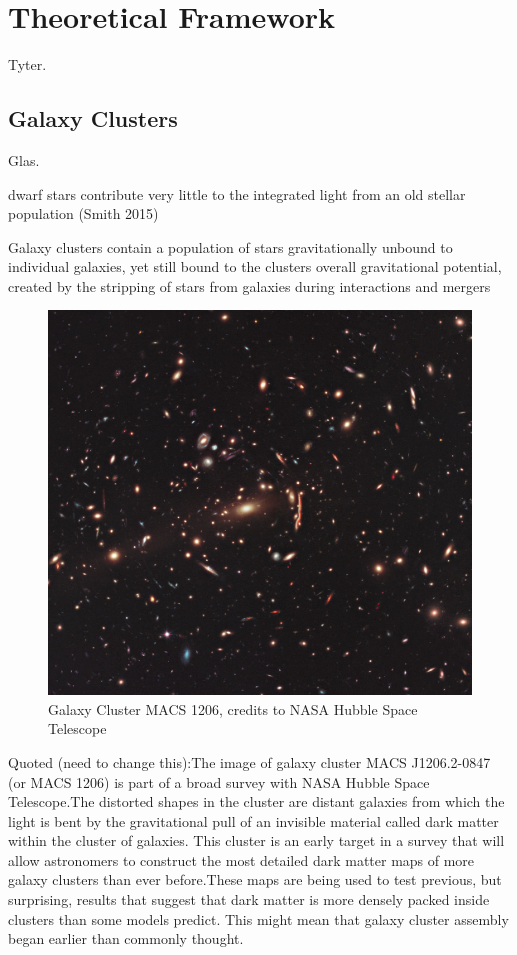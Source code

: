 \chapter{Theoretical Framework}

Tyter. 

\section{Galaxy Clusters}
 
Glas.

dwarf stars contribute very little to the integrated light from an old stellar population (Smith 2015)

Galaxy clusters contain a population of stars gravitationally unbound to individual galaxies, yet still bound to the clusters overall gravitational potential, created by the stripping of stars from galaxies during interactions and mergers

\begin{figure}[H]
\centering
\includegraphics[width=12cm]{images/GC.jpg}
\caption[Galaxy Cluster MACS 1206]{Galaxy Cluster MACS 1206, credits to NASA Hubble Space Telescope}
\end{figure}

Quoted (need to change this):The image of galaxy cluster MACS J1206.2-0847 (or MACS 1206) is part of a broad survey with NASA Hubble Space Telescope.The distorted shapes in the cluster are distant galaxies from which the light is bent by the gravitational pull of an invisible material called dark matter within the cluster of galaxies. This cluster is an early target in a survey that will allow astronomers to construct the most detailed dark matter maps of more galaxy clusters than ever before.These maps are being used to test previous, but surprising, results that suggest that dark matter is more densely packed inside clusters than some models predict. This might mean that galaxy cluster assembly began earlier than commonly thought.

